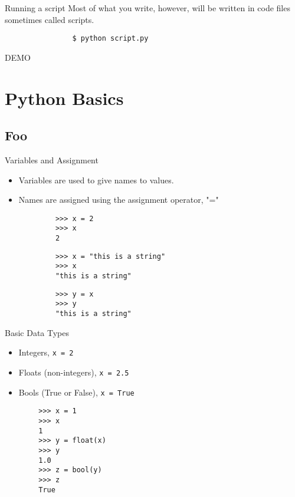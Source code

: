 \documentclass[serif,xcolor=pdftex,dvipsnames,table,hyperref={bookmarks=false,breaklinks}]{beamer}
\begin{document}
\begin{frame}[t,fragile]{Running a script}
	Most of what you write, however, will be written in code files sometimes called scripts.
	\pause
		\begin{tcolorbox}
			\begin{verbatim}
				$ python script.py
			\end{verbatim}
		\end{tcolorbox}
		
	\pause
	\center
	\Huge{DEMO}

\end{frame}

%

\section{Python Basics}
\subsection{Foo}

\begin{frame}[t,fragile]{Variables and Assignment}

	\begin{itemize}[<+->]
		\item Variables are used to give names to values.
		\item Names are assigned using the assignment operator, "="
	\end{itemize}

	\pause
	\begin{verbatim}
			>>> x = 2
			>>> x
			2
	\end{verbatim}
	\pause
	\begin{verbatim}
			>>> x = "this is a string"
			>>> x
			"this is a string"
	\end{verbatim}
	\pause
	\begin{verbatim}
			>>> y = x
			>>> y
			"this is a string"
	\end{verbatim}

\end{frame}

\begin{frame}[t,fragile]{Basic Data Types}
	\begin{itemize}[<+->]
		\item Integers, \verb|x = 2|
		\item Floats (non-integers), \verb|x = 2.5|
		\item Bools (True or False), \verb|x = True|
	\end{itemize}
	\pause
	\begin{tcolorbox}
	\begin{verbatim}
		>>> x = 1
		>>> x
		1
		>>> y = float(x)
		>>> y
		1.0
		>>> z = bool(y)
		>>> z
		True
	\end{verbatim}
	\end{tcolorbox}
\end{frame}
\end{document}
